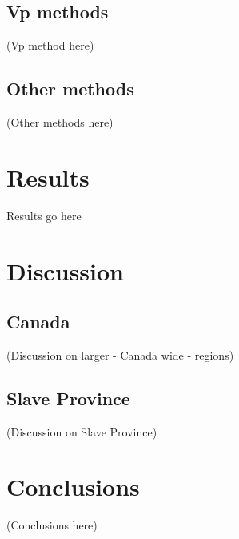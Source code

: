 \documentclass[draft]{article}
\begin{document}
\subsection{Vp methods}
(Vp method here)
\subsection{Other methods}
(Other methods here)

\section{Results}
{Results go here}

\section{Discussion}
\subsection{Canada}
(Discussion on larger - Canada wide - regions)
\subsection{Slave Province}
(Discussion on Slave Province)

\section{Conclusions}
(Conclusions here)




\begin{thebibliography}{}


\end{thebibliography}


\end{document}
